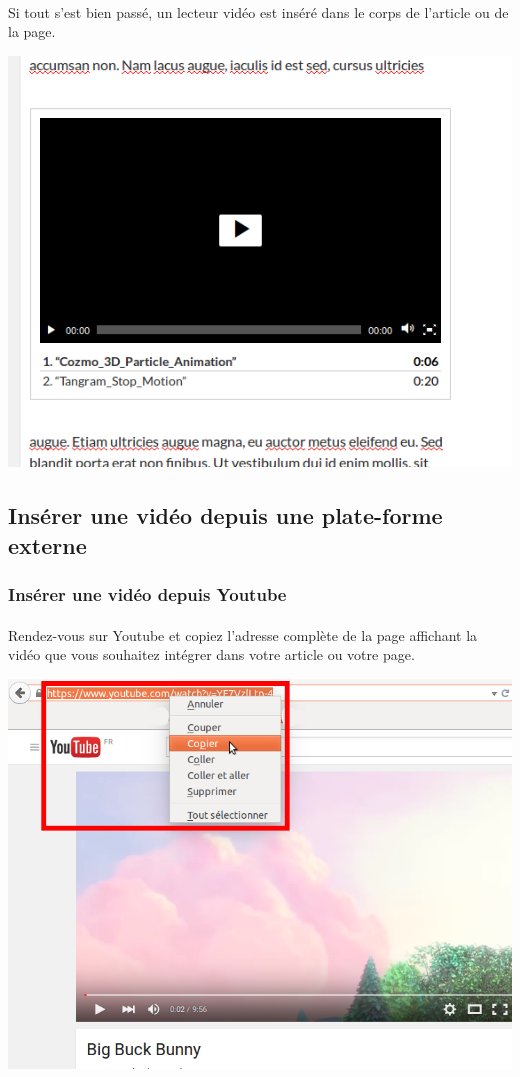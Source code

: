 \documentclass[10pt,a4paper]{article}
\begin{document}
\paragraph{}Si tout s'est bien passé, un lecteur vidéo est inséré dans le corps de l'article ou de la page.
\begin{center}
\includegraphics[scale=0.3]{img/0131.png}
\end{center}
\newpage
\subsection{Insérer une vidéo depuis une plate-forme externe}
\subsubsection{Insérer une vidéo depuis Youtube}
\paragraph{}Rendez-vous sur Youtube et copiez l'adresse complète de la page affichant la vidéo que vous souhaitez intégrer dans votre article ou votre page.
\begin{center}
\includegraphics[scale=0.3]{img/0132.png}
\end{center}
\end{document}
